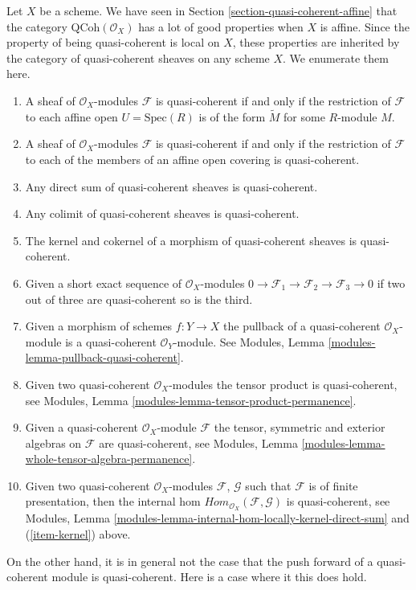 \noindent
Let $X$ be a scheme. We have seen in
Section \ref{section-quasi-coherent-affine}
that the category $\text{QCoh}(\mathcal{O}_X)$ has a lot of good properties
when $X$ is affine. Since the property of being quasi-coherent is
local on $X$, these properties are inherited by the category
of quasi-coherent sheaves on any scheme $X$. We enumerate them here.
\begin{enumerate}
\item A sheaf of $\mathcal{O}_X$-modules $\mathcal{F}$ is
quasi-coherent if and only if the restriction of $\mathcal{F}$
to each affine open $U = \text{Spec}(R)$ is of the form
$\widetilde M$ for some $R$-module $M$.
\item A sheaf of $\mathcal{O}_X$-modules $\mathcal{F}$ is
quasi-coherent if and only if the restriction of $\mathcal{F}$
to each of the members of an affine open covering is quasi-coherent.
\item Any direct sum of quasi-coherent sheaves is quasi-coherent.
\item Any colimit of quasi-coherent sheaves is quasi-coherent.
\item The kernel and cokernel of a morphism of quasi-coherent sheaves
is quasi-coherent.
\label{item-kernel}
\item Given a short exact sequence of $\mathcal{O}_X$-modules
$0 \to \mathcal{F}_1 \to \mathcal{F}_2 \to \mathcal{F}_3 \to 0$
if two out of three are quasi-coherent so is the third.
\item Given a morphism of schemes $f : Y \to X$ the pullback
of a quasi-coherent $\mathcal{O}_X$-module is a quasi-coherent
$\mathcal{O}_Y$-module. See
Modules, Lemma \ref{modules-lemma-pullback-quasi-coherent}.
\item Given two quasi-coherent $\mathcal{O}_X$-modules
the tensor product is quasi-coherent, see
Modules, Lemma \ref{modules-lemma-tensor-product-permanence}.
\item Given a quasi-coherent $\mathcal{O}_X$-module $\mathcal{F}$
the tensor, symmetric and exterior algebras on $\mathcal{F}$
are quasi-coherent, see
Modules, Lemma \ref{modules-lemma-whole-tensor-algebra-permanence}.
\item Given two quasi-coherent $\mathcal{O}_X$-modules
$\mathcal{F}$, $\mathcal{G}$ such that $\mathcal{F}$
is of finite presentation, then the internal hom
$\textit{Hom}_{\mathcal{O}_X}(\mathcal{F}, \mathcal{G})$
is quasi-coherent, see
Modules, Lemma \ref{modules-lemma-internal-hom-locally-kernel-direct-sum}
and (\ref{item-kernel}) above.
\end{enumerate}
On the other hand, it is in general not the case that the
push forward of a quasi-coherent module is quasi-coherent.
Here is a case where it this does hold.

